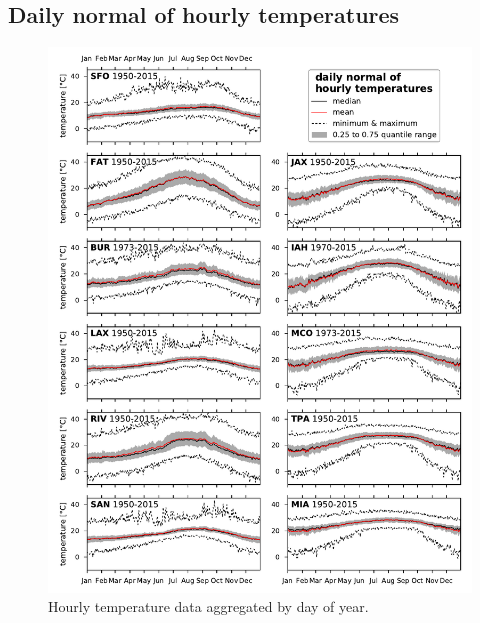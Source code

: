 \documentclass[10pt,a4paper]{article}
\begin{document}
\subsection{Daily normal of hourly temperatures}
\begin{figure}[hb!]
\centering
\includegraphics{figs/fig_all_hourly_temps_supernorm.pdf}
\caption{\label{fig:temperature_supernorm}
Hourly temperature data aggregated by day of year.
}
\end{figure}
\clearpage
\end{document}
